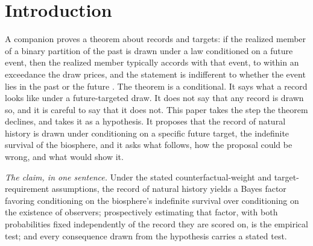 \begin{abstract}
\end{abstract}

\section{Introduction}\label{sec:intro}

A companion proves a theorem about records and targets: if the realized
member of a binary partition of the past is drawn under a law conditioned
on a future event, then the realized member typically accords with that
event, to within an exceedance the draw prices, and the statement is
indifferent to whether the event lies in the past or the future
\cite{GoldenTargeted}. The theorem is a conditional. It says what a record
looks like under a future-targeted draw. It does not say that any record
is drawn so, and it is careful to say that it does not. This paper takes
the step the theorem declines, and takes it as a hypothesis. It proposes
that the record of natural history is drawn under conditioning on a
specific future target, the indefinite survival of the biosphere, and it
asks what follows, how the proposal could be wrong, and what would show
it.

\emph{The claim, in one sentence.} Under the stated
counterfactual-weight and target-requirement assumptions, the record of
natural history yields a Bayes factor favoring conditioning on the
biosphere's indefinite survival over conditioning on the existence of
observers; prospectively estimating that factor, with both probabilities
fixed independently of the record they are scored on, is the empirical
test; and every consequence drawn from the hypothesis carries a stated
test.

